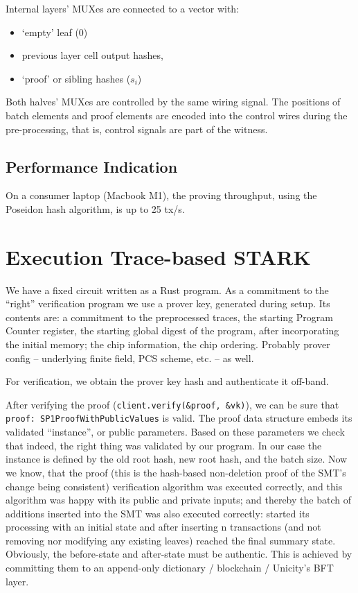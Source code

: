 \documentclass[twocolumn]{article}
\begin{document}
Internal layers' MUXes are connected to a vector with:
\begin{itemize}
    \item `empty' leaf ($0$)
    \item previous layer cell output hashes,
    \item `proof' or sibling hashes ($s_i$)
\end{itemize}

Both halves' MUXes are controlled by the same wiring signal. The positions of batch elements and proof elements are encoded into the control wires during the pre-processing, that is, control signals are part of the witness.

\subsection{Performance Indication}

On a consumer laptop (Macbook M1), the proving throughput, using the Poseidon hash algorithm, is up to 25 tx/s.

\section{Execution Trace-based STARK}

We have a fixed circuit written as a Rust program. As a commitment to the ``right'' verification program we use a prover key, generated during setup. Its contents are: a commitment to the preprocessed traces, the starting Program Counter register, the starting global digest of the program, after incorporating the initial memory; the chip information, the chip ordering. Probably prover config -- underlying finite field, PCS scheme, etc. -- as well.

For verification, we obtain the prover key hash and authenticate it off-band.

\begin{sloppypar}
After verifying the proof (\lstinline|client.verify(&proof, &vk)|), we can be sure that \lstinline|proof: SP1ProofWithPublicValues| is valid. The proof data structure embeds its validated ``instance'', or public parameters. Based on these parameters we check that indeed, the right thing was validated by our program. In our case the instance is defined by the old root hash, new root hash, and the batch size. Now we know, that the proof (this is the hash-based non-deletion proof of the SMT's change being consistent) verification algorithm was executed correctly, and this algorithm was happy with its public and private inputs; and thereby the batch of additions inserted into the SMT was also executed correctly: started its processing with an initial state and after inserting n transactions (and not removing nor modifying any existing leaves) reached the final summary state. Obviously, the before-state and after-state must be authentic. This is achieved by committing them to an append-only dictionary / blockchain / Unicity's BFT layer.
\end{sloppypar}
\end{document}

